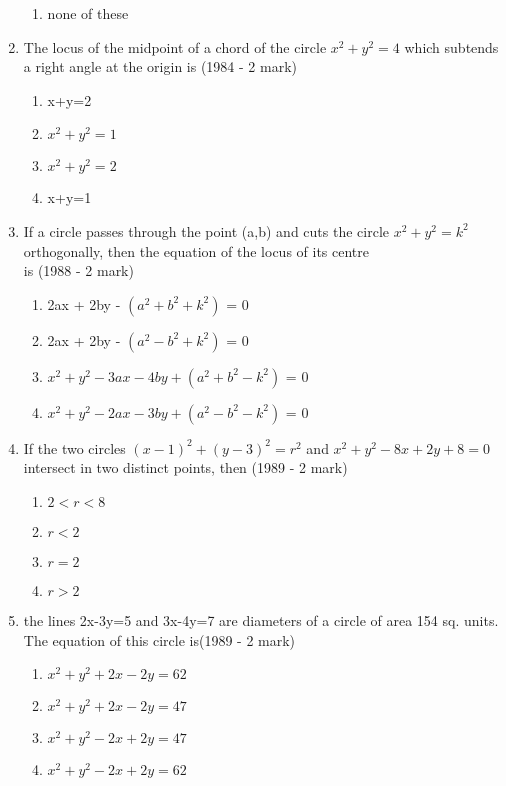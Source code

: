 \documentclass[journal,12pt,twocolumn]{IEEEtran}
\theoremstyle{remark}
\begin{document}
\begin{enumerate}[label=\arabic*.]
\begin{enumerate}[label=(\alph*)]
    \item none of these
    \end{enumerate}
    \item The locus of the midpoint of a chord of the circle $x^{2}+y^{2}=4$ which subtends a right angle at the origin is \hfill {(1984 - 2 mark)}
    \begin{enumerate}[label=(\alph*)]
    \item x+y=2
    \item $x^{2}+y^{2}=1$
    \item $x^{2}+y^{2}=2$
    \item x+y=1
    \end{enumerate}
    \item If a circle passes through the point (a,b) and cuts the circle $x^{2}+y^{2}=k^{2}$ orthogonally, then the equation of the locus of its centre\\ is 
    \hfill {(1988 - 2 mark)}
    \begin{enumerate}[label=(\alph*)]
    \item 2ax + 2by - $(a^{2}+b^{2}+k^{2})$ = 0
    \item 2ax + 2by - $(a^{2}-b^{2}+k^{2})$ = 0
    \item $x^{2} + y^{2}-3ax-4by+ (a^{2}+b^{2}-k^{2})$ = 0
    \item $x^{2} + y^{2}-2ax-3by+ (a^{2}-b^{2}-k^{2})$ = 0
    \end{enumerate}
    \item If the two circles $(x-1)^{2} + (y-3)^{2} = r^{2}$ and $x^{2}+y^{2}-8x+2y+8=0$ intersect in two distinct points, then \hfill {(1989 - 2 mark)} 
    \begin{enumerate}[label=(\alph*)]
    \item $2<r<8$
    \item $r<2$
    \item $r=2$
    \item $r>2$
    \end{enumerate}
    \item the lines 2x-3y=5 and 3x-4y=7 are diameters of a circle of area 154 sq. units. The equation of this circle is\hfill {(1989 - 2 mark)}
    \begin{enumerate}[label=(\alph*)]
    \item $x^{2}+y^{2}+2x-2y=62$
    \item $x^{2}+y^{2}+2x-2y=47$
    \item $x^{2}+y^{2}-2x+2y=47$
    \item $x^{2}+y^{2}-2x+2y=62$
    \end{enumerate}

\end{enumerate}
\end{document}

